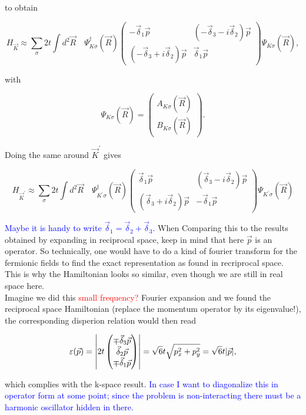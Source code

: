 \documentclass[../../../main.tex]{subfiles}
\begin{document}
to obtain 

\begin{equation}
	H_{\vec{K}} \approx \sum_\sigma 2t \int d^2\vec{R} \quad
	\Psi^\dagger_{K\sigma}(\vec{R})
	\begin{pmatrix}
		-\vec{\delta}_1\vec{p} & \left(-\vec{\delta}_3-i\vec{\delta}_2\right)\vec{p} \\
		\left(-\vec{\delta}_3 + i \vec{\delta}_2\right)\vec{p} & \vec{\delta}_1\vec{p}
	\end{pmatrix}
	\Psi_{K\sigma}(\vec{R}),
\end{equation}

with 

\begin{equation}
	\Psi_{K\sigma}(\vec{R}) =
	\begin{pmatrix}
		A_{K\sigma}(\vec{R}) \\
		B_{K\sigma}(\vec{R})
	\end{pmatrix}.
\end{equation}

Doing the same around $\vec{K}^\prime$ gives 

\begin{equation}
	H_{\vec{K}^\prime} \approx \sum_\sigma 2t \int d^2\vec{R} \quad 
	\Psi^\dagger_{K^\prime\sigma} (\vec{R})
	\begin{pmatrix}
		\vec{\delta}_1\vec{p} & \left(\vec{\delta}_3-i\vec{\delta}_2\right)\vec{p} \\
		\left(\vec{\delta}_3 +i \vec{\delta}_2\right)\vec{p} & -\vec{\delta}_1\vec{p}
	\end{pmatrix}
	\Psi_{K^\prime\sigma}(\vec{R})
\end{equation}

\textcolor{blue}{Maybe it is handy to write $\vec{\delta}_1 = \vec{\delta}_2 + \vec{\delta}_3$.} When Comparing this to the results obtained by expanding in reciprocal space, keep in mind that here $\vec{p}$ is an operator. So technically, one would have to do a kind of fourier transform for the fermionic fields to find the exact representation as found in recriprocal space. This is why the Hamiltonian looks so similar, even though we are still in real space here. \\

Imagine we did this \textcolor{red}{small frequency?} Fourier expansion and we found the reciprocal space Hamiltonian (replace the momentum operator by its eigenvalue!), the corresponding disperion relation would then read

\begin{equation}
	\varepsilon(\vec{p}) = \abs{2t
		\begin{pmatrix}
			\mp \vec{\delta}_3\vec{p} \\
			\vec{\delta}_2\vec{p} \\
			\mp \vec{\delta}_1\vec{p}
		\end{pmatrix} } = \sqrt{6}t\sqrt{p_x^2 + p_y^2} = \sqrt{6}t\abs{\vec{p}},
\end{equation}

which complies with the k-space result. \textcolor{blue}{In case I want to diagonalize this in operator form at some point; since the problem is non-interacting there must be a harmonic oscillator hidden in there.} \
\end{document}
